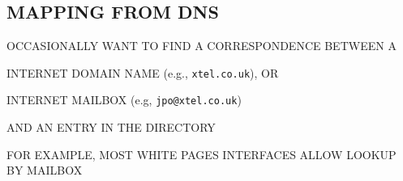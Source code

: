 



\begin{bwslide}
\part*	{MAPPING FROM DNS}\bf

\begin{nrtc}
\item	OCCASIONALLY WANT TO FIND A CORRESPONDENCE BETWEEN A
    \begin{nrtc}
    \item	INTERNET DOMAIN NAME (e.g., \verb"xtel.co.uk"), OR

    \item	INTERNET MAILBOX (e.g, \verb"jpo@xtel.co.uk")
    \end{nrtc}
    AND AN ENTRY IN THE DIRECTORY

\item	FOR EXAMPLE,
	MOST WHITE PAGES INTERFACES ALLOW LOOKUP BY MAILBOX
\end{nrtc}
\end{bwslide}


